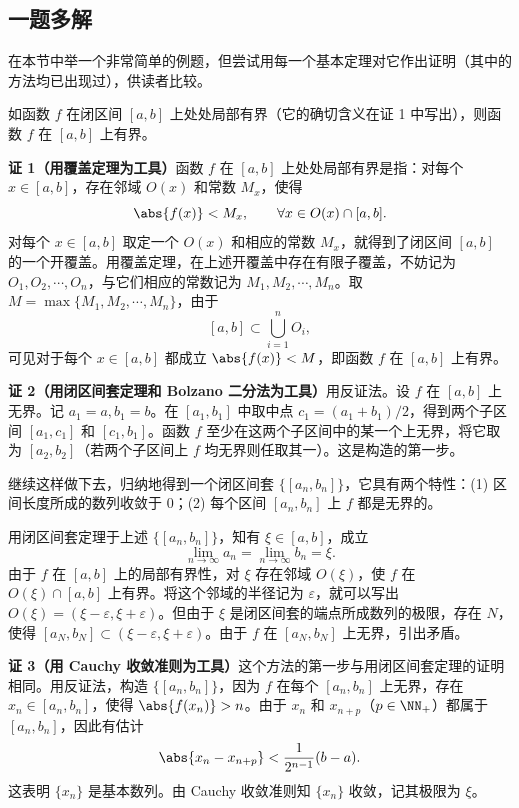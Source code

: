 \subsection{一题多解}

在本节中举一个非常简单的例题，但尝试用每一个基本定理对它作出证明（其中的方法均已出现过），供读者比较。

\begin{xexample}[3.7.1]
如函数 $f$ 在闭区间 $[a,b]$ 上处处局部有界（它的确切含义在证 1 中写出），则函数 $f$ 在 $[a,b]$ 上有界。
\end{xexample}
\begin{xproof}
\textbf{证 1（用覆盖定理为工具）}\quad 函数 $f$ 在 $[a,b]$ 上处处局部有界是指：对每个 $x\in[a,b]$，存在邻域 $O(x)$ 和常数 $M_x$，使得
\[
  \abs{f(x)}<M_x,\qquad \forall x\in O(x)\cap[a,b].
\]
对每个 $x\in[a,b]$ 取定一个 $O(x)$ 和相应的常数 $M_x$，就得到了闭区间 $[a,b]$ 的一个开覆盖。用覆盖定理，在上述开覆盖中存在有限子覆盖，不妨记为 $O_1,O_2,\cdots,O_n$，与它们相应的常数记为 $M_1,M_2,\cdots,M_n$。取 $M=\max\{M_1,M_2,\cdots,M_n\}$，由于
\[
  [a,b]\subset\bigcup_{i=1}^{n}O_i,
\]
可见对于每个 $x\in[a,b]$ 都成立 $\abs{f(x)}<M$，即函数 $f$ 在 $[a,b]$ 上有界。

\textbf{证 2（用闭区间套定理和 Bolzano 二分法为工具）}\quad 用反证法。设 $f$ 在 $[a,b]$ 上无界。记 $a_1=a,b_1=b$。在 $[a_1,b_1]$ 中取中点 $c_1=(a_1+b_1)/2$，得到两个子区间 $[a_1,c_1]$ 和 $[c_1,b_1]$。函数 $f$ 至少在这两个子区间中的某一个上无界，将它取为 $[a_2,b_2]$（若两个子区间上 $f$ 均无界则任取其一）。这是构造的第一步。

继续这样做下去，归纳地得到一个闭区间套 $\{[a_n,b_n]\}$，它具有两个特性：(1) 区间长度所成的数列收敛于 $0$；(2) 每个区间 $[a_n,b_n]$ 上 $f$ 都是无界的。

用闭区间套定理于上述 $\{[a_n,b_n]\}$，知有 $\xi\in[a,b]$，成立
\[
  \lim_{n\to\infty}a_n=\lim_{n\to\infty}b_n=\xi.
\]
由于 $f$ 在 $[a,b]$ 上的局部有界性，对 $\xi$ 存在邻域 $O(\xi)$，使 $f$ 在 $O(\xi)\cap[a,b]$ 上有界。将这个邻域的半径记为 $\varepsilon$，就可以写出 $O(\xi)=(\xi-\varepsilon,\xi+\varepsilon)$。但由于 $\xi$ 是闭区间套的端点所成数列的极限，存在 $N$，使得 $[a_N,b_N]\subset(\xi-\varepsilon,\xi+\varepsilon)$。由于 $f$ 在 $[a_N,b_N]$ 上无界，引出矛盾。

\textbf{证 3（用 Cauchy 收敛准则为工具）}\quad 这个方法的第一步与用闭区间套定理的证明相同。用反证法，构造 $\{[a_n,b_n]\}$，因为 $f$ 在每个 $[a_n,b_n]$ 上无界，存在 $x_n\in[a_n,b_n]$，使得 $\abs{f(x_n)}>n$。由于 $x_n$ 和 $x_{n+p}$（$p\in\NN_+$）都属于 $[a_n,b_n]$，因此有估计
\[
  \abs{x_n-x_{n+p}}<\frac1{2^{n-1}}(b-a).
\]
这表明 $\{x_n\}$ 是基本数列。由 Cauchy 收敛准则知 $\{x_n\}$ 收敛，记其极限为 $\xi$。


\end{xproof}
